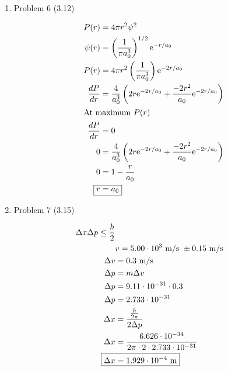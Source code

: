 \documentclass[12pt]{article}
\begin{document}
\begin{enumerate}
    \begin{align*}
        P_{1/3} &= \int_{a/3}^{2a/3} \psi^*\psi dx \\
        P_{1/3} &= \frac{2}{a} \int_{a/3}^{2a/3} \sin^2\left(\frac{\pi x}{a}\right) dx \\
        P_{1/3} &= \frac{2}{a} \left[\frac{1}{2}x - \frac{1}{4} \cdot \frac{a}{\pi} \sin\left(\frac{2\pi x}{a}\right) \right]_{a/3}^{2a/3} \\
        P_{1/3} &= \frac{2}{a} \left[\left(\frac{1}{2} \cdot \frac{2a}{3} - \frac{1}{4} \cdot \frac{a}{\pi} \sin\left(\frac{2\pi \cdot \frac{2a}{3}}{a}\right)\right) - \left(\frac{1}{2} \cdot \frac{a}{3} - \frac{1}{4} \cdot \frac{a}{\pi} \sin\left(\frac{2\pi \cdot \frac{a}{3}}{a}\right)\right)\right] \\
        \Aboxed{P_{1/3} &= 0.609}
    \end{align*}

    \newpage
    \item Problem 6 (3.12)
    
    \begin{align*}
        P(r) &= 4 \pi r^2 \psi^2 \\
        \psi (r) &= \left(\frac{1}{\pi a_0^3}\right)^{1/2} \text{e}^{-r/a_0} \\
        P(r) &= 4 \pi r^2 \left(\frac{1}{\pi a_0^3}\right) \text{e}^{-2r/a_0} \\
        \frac{dP}{dr} &= \frac{4}{a_0^3} \left(2r\text{e}^{-2r/a_0} + \frac{-2r^2}{a_0} \text{e}^{-2r/a_0}\right) \\
        \intertext{At maximum $P(r)$}
        \frac{dP}{dr} &= 0 \\
        0 &= \frac{4}{a_0^3} \left(2r\text{e}^{-2r/a_0} + \frac{-2r^2}{a_0} \text{e}^{-2r/a_0}\right) \\
        0 &= 1 - \frac{r}{a_0} \\
        \Aboxed{r &= a_0}
    \end{align*}

    \newpage
    \item Problem 7 (3.15)
    
    \begin{align*}
        \Delta x \Delta p \leq \frac{\hbar}{2} \\
        & v = 5.00 \cdot 10^{3} \text{ m/s } \pm 0.15 \text{ m/s} \\
        \Delta v &= 0.3 \text{ m/s} \\
        \Delta p &= m \Delta v \\
        \Delta p &= 9.11 \cdot 10^{-31} \cdot 0.3 \\
        \Delta p &= 2.733 \cdot 10^{-31} \\
        \Delta x &= \frac{\frac{h}{2\pi}}{2 \Delta p} \\
        \Delta x &= \frac{6.626 \cdot 10^{-34}}{2\pi \cdot 2 \cdot 2.733 \cdot 10^{-31}} \\
        \Aboxed{\Delta x &= 1.929 \cdot 10^{-4} \text{ m}}
    \end{align*}

\end{enumerate}
\end{document}

